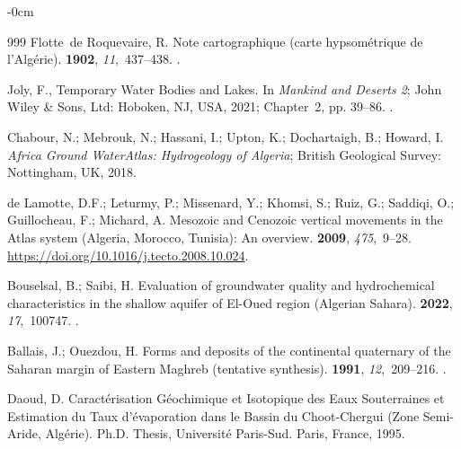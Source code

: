 \documentclass[asi,article,accept,pdftex,moreauthors]{Definitions/mdpi}
\begin{document}
\begin{adjustwidth}{-\extralength}{0cm}
\begin{thebibliography}{999}
Flotte~de Roquevaire, R.
\newblock Note cartographique (carte hypsométrique de l'Algérie).
 {\bf 1902}, {\em 11},~437--438.
.

Joly, F., Temporary Water Bodies and Lakes.
\newblock In {\em Mankind and Deserts 2}; John Wiley \& Sons, Ltd: Hoboken, NJ, USA, %
2021;
  Chapter~2, pp. 39--86.
.

Chabour, N.; Mebrouk, N.; Hassani, I.; Upton, K.; Dochartaigh, B.; Howard, I.
\newblock \emph{Africa Ground WaterAtlas: Hydrogeology of Algeria};  British Geological Survey: Nottingham, UK, %
 2018.

{de Lamotte}, D.F.; Leturmy, P.; Missenard, Y.; Khomsi, S.; Ruiz, G.; Saddiqi,
  O.; Guillocheau, F.; Michard, A.
\newblock Mesozoic and Cenozoic vertical movements in the Atlas system
  (Algeria, Morocco, Tunisia): An overview.
 {\bf 2009}, {\em 475},~9--28. %
  {\url{https://doi.org/10.1016/j.tecto.2008.10.024}}.

Bouselsal, B.; Saibi, H.
\newblock Evaluation of groundwater quality and hydrochemical characteristics
  in the shallow aquifer of El-Oued region (Algerian Sahara).
 {\bf 2022}, {\em
  17},~100747.
.

Ballais, J.; Ouezdou, H.
\newblock Forms and deposits of the continental quaternary of the Saharan
  margin of Eastern Maghreb (tentative synthesis).
 {\bf
  1991}, {\em 12},~209--216.
.

Daoud, D.
\newblock Caract{\'e}risation G{\'e}ochimique et Isotopique des Eaux
  Souterraines et Estimation du Taux d'{\'e}vaporation dans le Bassin du
  Choot-Chergui (Zone Semi-Aride, Alg{\'e}rie).
\newblock Ph.D. Thesis, Université Paris-Sud. Paris, France, %
 1995.


\end{thebibliography}
\end{adjustwidth}
\end{document}
